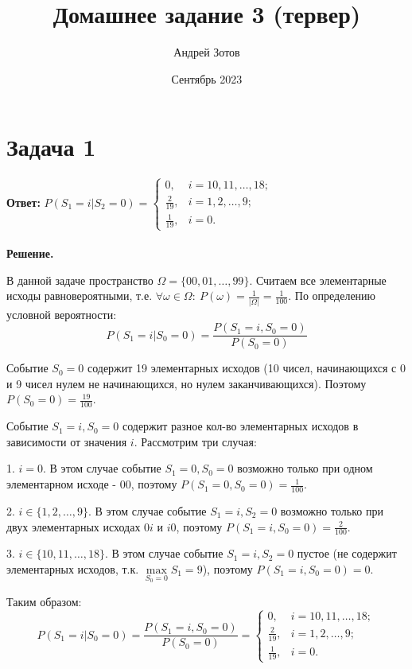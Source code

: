 \documentclass{article}
\title{Домашнее задание 3 (тервер)}
\author{Андрей Зотов}
\date{Сентябрь 2023}
\begin{document}
\maketitle

\section*{Задача 1}
{\bf Ответ: } $P(S_1=i|S_2=0)=\begin{cases}0,&i=10,11,\dots,18;\\\frac{2}{19},&i=1,2,\dots,9;\\\frac{1}{19},&i=0.\end{cases}$
\\
\\
{\bf Решение.}
\par
В данной задаче пространство $\Omega=\{00,01,\dots,99\}$. Считаем все элементарные исходы равновероятными, т.е. $\forall \omega\in\Omega:\ P(\omega)=\frac{1}{|\Omega|}=\frac{1}{100}$.
По определению условной вероятности:
$$P(S_1=i|S_0=0)=\frac{P(S_1=i,S_0=0)}{P(S_0=0)}$$
\par
Событие $S_0=0$ содержит 19 элементарных исходов (10 чисел, начинающихся с 0 и 9 чисел нулем не начинающихся, но нулем заканчивающихся). Поэтому $P(S_0=0)=\frac{19}{100}$.
\par
Событие $S_1=i,S_0=0$ содержит разное кол-во элементарных исходов в зависимости от значения $i$. Рассмотрим три случая:
\par
1. $i=0$. В этом случае событие $S_1=0,S_0=0$ возможно только при одном элементарном исходе - $00$, поэтому $P(S_1=0,S_0=0)=\frac{1}{100}$.
\par
2. $i \in \{1, 2,\dots,9\}$.  В этом случае событие $S_1=i,S_2=0$ возможно только при двух элементарных исходах $0i$ и $i0$, поэтому $P(S_1=i,S_0=0)=\frac{2}{100}$.
\par
3. $i \in \{10, 11,\dots,18\}$. В этом случае событие $S_1=i,S_2=0$ пустое (не содержит элементарных исходов, т.к. $\max\limits_{S_0=0} S_1 = 9$), поэтому $P(S_1=i,S_0=0)=0$.
\par
Таким образом:
$$P(S_1=i|S_0=0)=\frac{P(S_1=i,S_0=0)}{P(S_0=0)}=\begin{cases}0,&i=10,11,\dots,18;\\\frac{2}{19},&i=1,2,\dots,9;\\\frac{1}{19},&i=0.\end{cases}$$
\end{document}
